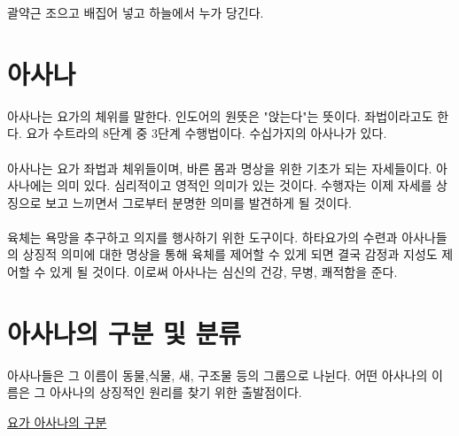 \documentclass[12pt, a4paper, oneside]{book}
\let\stdsection\section
\renewcommand\section{\newpage\stdsection}
\begin{document}
괄약근 조으고
배집어 넣고
하늘에서 누가 당긴다.




		\section{아사나}



아사나는 요가의 체위를 말한다. 
인도어의 원뜻은 "앉는다"는 뜻이다. 
좌법이라고도 한다. 
요가 수트라의 8단계 중 3단계 수행법이다. 
수십가지의 아사나가 있다.

\paragraph{} 아사나는 요가 좌법과 체위들이며, 바른 몸과 명상을 위한 기초가 되는 자세들이다.
아사나에는 의미 있다.
심리적이고 영적인 의미가 있는 것이다.
수행자는 이제 자세를 상징으로 보고 느끼면서 그로부터 분명한 의미를 발견하게 될 것이다.

\paragraph{} 육체는 욕망을 추구하고 의지를 행사하기 위한 도구이다. 하타요가의 수련과 아사나들의 상징적 의미에 대한 명상을 통해 육체를 제어할 수 있게 되면 결국 감정과 지성도 제어할 수 있게 될 것이다.
이로써 아사나는 심신의 건강, 무병, 쾌적함을 준다.





%
%
%
\newpage
\section{아사나의 구분 및 분류 }

아사나들은 그 이름이 동물,식물, 새, 구조물 등의 그룹으로  나뉜다.
어떤 아사나의 이름은 그 아사나의 상징적인 원리를  찾기 위한 출발점이다.


	\href{http://yogaman.co.kr/wordpress/yoga/yogaasana_name_search.php}{요가 아사나의 구분}


\end{document}

